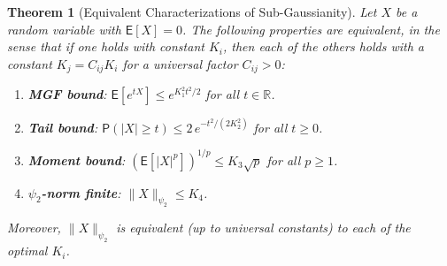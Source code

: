 \documentclass[14pt]{extarticle}
\theoremstyle{plain}
\newtheorem{theorem}{Theorem}[section]
\theoremstyle{definition}
\theoremstyle{remark}
\newcommand\expc{\mathsf{E}}
\newcommand\prb{\mathsf{P}}
\newcommand{\Real}{\mathbb{R}}
\begin{document}
\begin{theorem}[Equivalent Characterizations of Sub-Gaussianity]\label{thm:subgaussian-equiv}
Let $X$ be a random variable with $\expc[X] = 0$. The following properties are equivalent, in the sense that if one holds with constant $K_i$, then each of the others holds with a constant $K_j = C_{ij} K_i$ for a universal factor $C_{ij} > 0$:
\begin{enumerate}[label=\textup{(\roman*)}]
\item\label{sg:mgf} \textbf{MGF bound}: $\expc[e^{tX}] \leqslant e^{K_1^2 t^2/2}$ for all $t \in \Real$.
\item\label{sg:tail} \textbf{Tail bound}: $\prb(|X| \geqslant t) \leqslant 2\,e^{-t^2/(2K_2^2)}$ for all $t \geqslant 0$.
\item\label{sg:moment} \textbf{Moment bound}: $(\expc[|X|^p])^{1/p} \leqslant K_3\sqrt{p}$ for all $p \geqslant 1$.
\item\label{sg:psi2} \textbf{$\psi_2$-norm finite}: $\|X\|_{\psi_2} \leqslant K_4$.
\end{enumerate}
Moreover, $\|X\|_{\psi_2}$ is equivalent (up to universal constants) to each of the optimal $K_i$.
\end{theorem}
\end{document}

